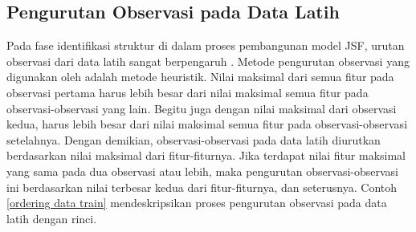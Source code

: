 \subsection{Pengurutan Observasi pada Data Latih}
\noindent Pada fase identifikasi struktur di dalam proses pembangunan model JSF, urutan observasi dari data latih sangat berpengaruh \cite{yeh}. Metode pengurutan observasi yang digunakan oleh  adalah metode heuristik. Nilai maksimal dari semua fitur pada observasi pertama harus lebih besar dari nilai maksimal semua fitur pada observasi-observasi yang lain. Begitu juga dengan nilai maksimal dari observasi kedua, harus lebih besar dari nilai maksimal semua fitur pada observasi-observasi setelahnya. Dengan demikian, observasi-observasi pada data latih diurutkan berdasarkan nilai maksimal dari fitur-fiturnya. Jika terdapat nilai fitur maksimal yang sama pada dua observasi atau lebih, maka pengurutan observasi-observasi ini berdasarkan nilai terbesar kedua dari fitur-fiturnya, dan seterusnya. Contoh \ref{ordering data train} mendeskripsikan proses pengurutan observasi pada data latih dengan rinci. 


